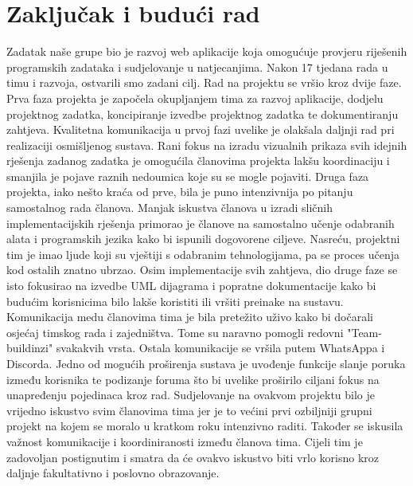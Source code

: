 \chapter{Zaključak i budući rad}
		
		Zadatak naše grupe bio je razvoj web aplikacije koja omogućuje provjeru riješenih programskih zadataka i sudjelovanje u natjecanjima. Nakon 17 tjedana rada u timu i razvoja, ostvarili smo zadani cilj. Rad na projektu se vršio kroz dvije faze. 
		\newline \hspace*{12pt}
		Prva faza projekta je započela okupljanjem tima za razvoj aplikacije, dodjelu projektnog zadatka, koncipiranje izvedbe projektnog zadatka te dokumentiranju zahtjeva. Kvalitetna komunikacija u prvoj fazi uvelike je olakšala daljnji rad pri realizaciji osmišljenog sustava. Rani fokus na izradu vizualnih prikaza svih idejnih rješenja zadanog zadatka je omogućila članovima projekta lakšu koordinaciju i smanjila je pojave raznih nedoumica koje su se mogle pojaviti.
		\newline \hspace*{12pt}
		Druga faza projekta, iako nešto kraća od prve, bila je puno intenzivnija po pitanju samostalnog rada članova. Manjak iskustva članova u izradi sličnih implementacijskih rješenja primorao je članove na samostalno učenje odabranih alata i programskih jezika kako bi ispunili dogovorene ciljeve. Nasreću, projektni tim je imao ljude koji su vještiji s odabranim tehnologijama, pa se proces učenja kod ostalih znatno ubrzao. Osim implementacije svih zahtjeva, dio druge faze se isto fokusirao na izvedbe UML dijagrama i popratne dokumentacije kako bi budućim korisnicima bilo lakše koristiti ili vršiti preinake na sustavu.
		\newline \hspace*{12pt}
		Komunikacija medu članovima tima je bila pretežito uživo kako bi dočarali osjećaj timskog rada i zajedništva. Tome su naravno pomogli redovni "Team-buildinzi" svakakvih vrsta. Ostala komunikacije se vršila putem WhatsAppa i Discorda. Jedno od mogućih proširenja sustava je uvođenje funkcije slanje poruka između korisnika te podizanje foruma što bi uvelike proširilo ciljani fokus na unapređenju pojedinaca kroz rad.
		\newline \hspace*{12pt}
		Sudjelovanje na ovakvom projektu bilo je vrijedno iskustvo svim članovima
		tima jer je to većini prvi ozbiljniji grupni projekt na kojem se moralo u kratkom roku intenzivno raditi. Također se iskusila važnost komunikacije i koordiniranosti između članova tima. Cijeli tim je zadovoljan postignutim i smatra da će ovakvo iskustvo biti vrlo korisno kroz daljnje fakultativno i poslovno obrazovanje. 
		
		
		\eject 